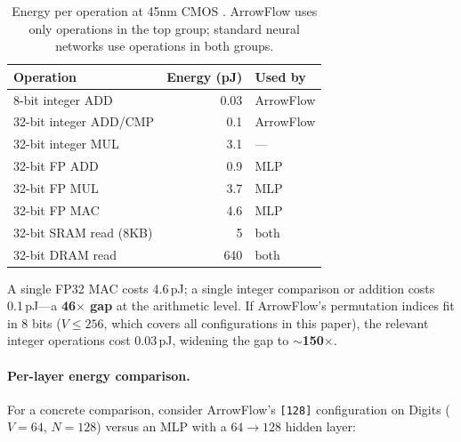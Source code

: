 \documentclass[12pt]{article}
\begin{document}
\begin{table}[ht]
\centering
\caption{Energy per operation at 45nm CMOS \citep{horowitz2014energy}. ArrowFlow uses only operations in the top group; standard neural networks use operations in both groups.}
\label{tab:energy-ops}
\small
\begin{tabular}{lrl}
\toprule
Operation & Energy (pJ) & Used by \\
\midrule
8-bit integer ADD        & 0.03  & ArrowFlow \\
32-bit integer ADD/CMP   & 0.1   & ArrowFlow \\
32-bit integer MUL       & 3.1   & --- \\
\midrule
32-bit FP ADD            & 0.9   & MLP \\
32-bit FP MUL            & 3.7   & MLP \\
32-bit FP MAC            & 4.6   & MLP \\
\midrule
32-bit SRAM read (8KB)   & 5     & both \\
32-bit DRAM read         & 640   & both \\
\bottomrule
\end{tabular}
\end{table}

A single FP32 MAC costs 4.6\,pJ; a single integer comparison or addition costs 0.1\,pJ---a \textbf{46$\times$ gap} at the arithmetic level. If ArrowFlow's permutation indices fit in 8 bits ($V \leq 256$, which covers all configurations in this paper), the relevant integer operations cost 0.03\,pJ, widening the gap to \textbf{$\sim$150$\times$}.

\paragraph{Per-layer energy comparison.}
For a concrete comparison, consider ArrowFlow's \texttt{[128]} configuration on Digits ($V = 64$, $N = 128$) versus an MLP with a $64 \to 128$ hidden layer:
\end{document}
